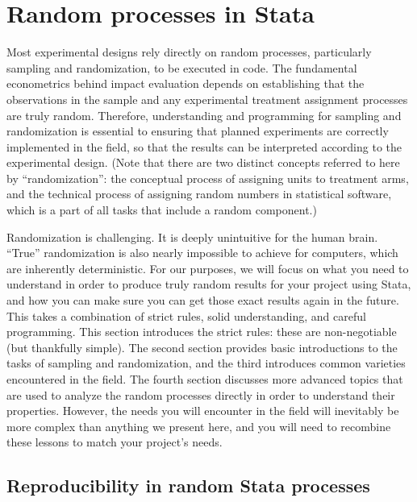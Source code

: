 
\section{Random processes in Stata}

Most experimental designs rely directly on random processes,
particularly sampling and randomization, to be executed in code.
The fundamental econometrics behind impact evaluation
depends on establishing that the observations in the sample
and any experimental treatment assignment processes are truly random.
Therefore, understanding and programming for sampling and randomization
is essential to ensuring that planned experiments
are correctly implemented in the field, so that the results
can be interpreted according to the experimental design.
(Note that there are two distinct concepts referred to here by ``randomization'':
the conceptual process of assigning units to treatment arms,
and the technical process of assigning random numbers in statistical software,
which is a part of all tasks that include a random component.)

Randomization is challenging. It is deeply unintuitive for the human brain.
``True'' randomization is also nearly impossible to achieve for computers,
which are inherently deterministic.
For our purposes, we will focus on what you need to understand
in order to produce truly random results for your project using Stata,
and how you can make sure you can get those exact results again in the future.
This takes a combination of strict rules, solid understanding, and careful programming.
This section introduces the strict rules: these are non-negotiable (but thankfully simple).
The second section provides basic introductions to the tasks of sampling and randomization,
and the third introduces common varieties encountered in the field.
The fourth section discusses more advanced topics that are used
to analyze the random processes directly in order to understand their properties.
However, the needs you will encounter in the field will inevitably
be more complex than anything we present here,
and you will need to recombine these lessons to match your project's needs.

\subsection{Reproducibility in random Stata processes}

